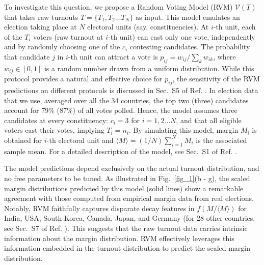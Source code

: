 \documentclass[reprint,aps,prl,showpacs,twocolumn, superscriptaddress]{revtex4-2}
\begin{document}
To investigate this question, we propose a Random Voting Model (RVM) ${\mathcal V}(T)$ that takes raw turnouts $T=\{T_1, T_2 \dots T_N\}$ as input. This model emulates an election taking place at $N$ electoral units (say, constituencies). At $i$-th unit, each of the $T_i$ voters (raw turnout at $i$-th unit) can cast only one vote, independently and by randomly choosing one of the $c_i$ contesting candidates. The probability that candidate $j$ in $i$-th unit can attract a vote is $p_{ij}= w_{ij}/\sum_k w_{ik}$, where $w_{ij} \in [0,1]$ is a random number drawn from a uniform distribution. While this protocol provides a natural and effective choice for $p_{ij}$, the sensitivity of the RVM predictions on different protocols is discussed in Sec.~S5 of Ref. \cite{supp}. In election data that we use, averaged over all the 34 countries, the top two (three) candidates account for 79\% (87\%) of all votes polled. Hence, the model assumes three candidates at every constituency: $c_i=3$ for $i=1,2 \dots N$, and that all eligible voters cast their votes, implying $T_i = n_i$. By simulating this model, margin $M_i$ is obtained for $i$-th electoral unit and $\langle M \rangle = (1/N) \sum_{i=1}^N M_i$ is the associated sample mean. For a detailed description of the model, see Sec.~S1 of Ref. \cite{supp}. 

The model predictions depend exclusively on the actual turnout distribution, and no free parameters to be tuned. As illustrated in Fig.~\ref{fig_1}(b - g), the scaled margin distributions predicted by this model (solid lines) show a remarkable agreement with those computed from empirical margin data from real elections. Notably, RVM faithfully captures disparate decay features in  $f(M/\langle M \rangle)$ for India, USA, South Korea, Canada, Japan, and Germany (for 28 other countries, see Sec.~S7 of Ref. \cite{supp}). This suggests that the raw turnout data carries intrinsic information about the margin distribution. RVM effectively leverages this information embedded in the turnout distribution to predict the scaled margin distribution. 
\end{document}
